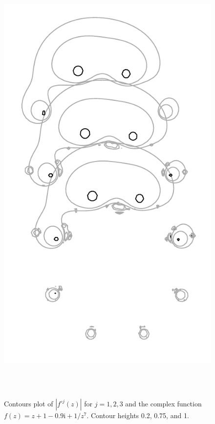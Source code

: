 \documentclass[12pt, a4paper]{amsart}
\newcommand{\mi}{\text{i}}  %
\begin{document}
\begin{figure}[!ht]
\includegraphics[height=230mm]{three_monkeys.pdf}
\caption{
Contours plot of $|f^{\circ j}(z)|$ for $j = 1, 2, 3$ and the complex function $f(z) = z + 1 -0.9\mi + 1/z^7$.
Contour heights 0.2, 0.75, and 1.
}
\end{figure}
\pagebreak
\end{document}
